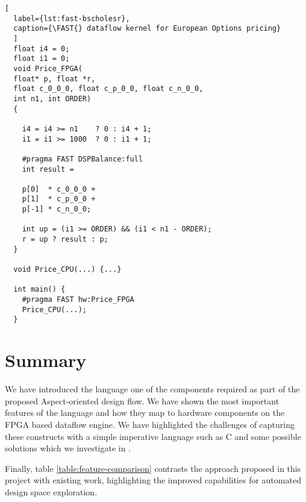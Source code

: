 \lstset{style=MaxC}

\begin{lstlisting}[
  label={lst:fast-bscholesr},
  caption={\FAST{} dataflow kernel for European Options pricing}
  ]
  float i4 = 0;
  float i1 = 0;
  void Price_FPGA(
  float* p, float *r,
  float c_0_0_0, float c_p_0_0, float c_n_0_0,
  int n1, int ORDER)
  {

    i4 = i4 >= n1    ? 0 : i4 + 1;
    i1 = i1 >= 1000  ? 0 : i1 + 1;

    #pragma FAST DSPBalance:full
    int result =

    p[0]  * c_0_0_0 +
    p[1]  * c_p_0_0 +
    p[-1] * c_n_0_0;

    int up = (i1 >= ORDER) && (i1 < n1 - ORDER);
    r = up ? result : p;
  }

  void Price_CPU(...) {...}

  int main() {
    #pragma FAST hw:Price_FPGA
    Price_CPU(...);
  }
\end{lstlisting}


\section{Summary}

We have introduced the \FAST{} language one of the components required
as part of the proposed Aspect-oriented design flow. We have shown the
most important features of the \FAST{} language and how they map to
hardware components on the FPGA based dataflow engine. We have
highlighted the challenges of capturing these constructs with a simple
imperative language such as C and some possible solutions which we
investigate in  .

Finally, table \ref{table:feature-comparison} contrasts the \FAST{}
approach proposed in this project with existing work, highlighting the
improved capabilities for automated design space exploration.



